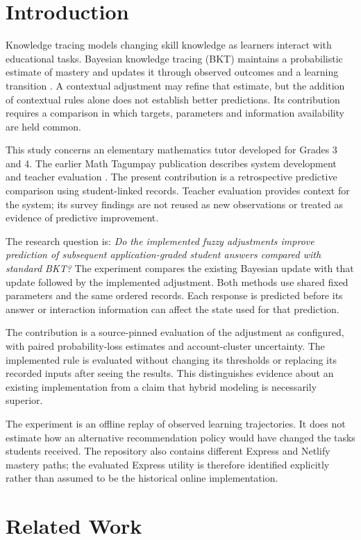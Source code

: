 \documentclass[conference]{IEEEtran}
\begin{document}
\section{Introduction}
Knowledge tracing models changing skill knowledge as learners interact with educational tasks. Bayesian knowledge tracing (BKT) maintains a probabilistic estimate of mastery and updates it through observed outcomes and a learning transition \cite{corbett1994}. A contextual adjustment may refine that estimate, but the addition of contextual rules alone does not establish better predictions. Its contribution requires a comparison in which targets, parameters and information availability are held common.

This study concerns an elementary mathematics tutor developed for Grades 3 and 4. The earlier Math Tagumpay publication describes system development and teacher evaluation \cite{ruiz2026}. The present contribution is a retrospective predictive comparison using student-linked records. Teacher evaluation provides context for the system; its survey findings are not reused as new observations or treated as evidence of predictive improvement.

The research question is: \emph{Do the implemented fuzzy adjustments improve prediction of subsequent application-graded student answers compared with standard BKT?} The experiment compares the existing Bayesian update with that update followed by the implemented adjustment. Both methods use shared fixed parameters and the same ordered records. Each response is predicted before its answer or interaction information can affect the state used for that prediction.

The contribution is a source-pinned evaluation of the adjustment as configured, with paired probability-loss estimates and account-cluster uncertainty. The implemented rule is evaluated without changing its thresholds or replacing its recorded inputs after seeing the results. This distinguishes evidence about an existing implementation from a claim that hybrid modeling is necessarily superior.

The experiment is an offline replay of observed learning trajectories. It does not estimate how an alternative recommendation policy would have changed the tasks students received. The repository also contains different Express and Netlify mastery paths; the evaluated Express utility is therefore identified explicitly rather than assumed to be the historical online implementation.

\section{Related Work}
\end{document}
